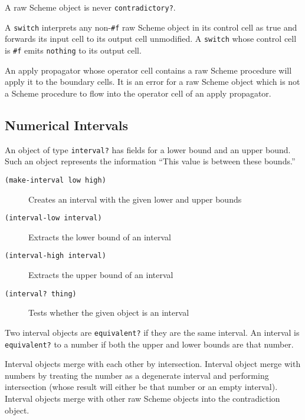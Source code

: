 \documentclass[12pt,letterpaper,english]{article}
\begin{document}
A raw Scheme object is never \texttt{contradictory?}.

A \texttt{switch} interprets any non-\texttt{{\#}f} raw Scheme object in its
control cell as true and forwards its input cell to its output cell
unmodified.  A \texttt{switch} whose control cell is \texttt{{\#}f} emits
\texttt{nothing} to its output cell.

An apply propagator whose operator cell contains a raw Scheme
procedure will apply it to the boundary cells.  It is an error for a
raw Scheme object which is not a Scheme procedure to flow into the
operator cell of an apply propagator.



\subsection{Numerical Intervals}
\label{numerical-intervals}

An object of type \texttt{interval?} has fields for a lower bound and an
upper bound.  Such an object represents the information ``This value is
between these bounds.''
\begin{description}
\item[{\texttt{(make-interval low high)}}] \leavevmode 
Creates an interval with the given lower and upper bounds

\item[{\texttt{(interval-low interval)}}] \leavevmode 
Extracts the lower bound of an interval

\item[{\texttt{(interval-high interval)}}] \leavevmode 
Extracts the upper bound of an interval

\item[{\texttt{(interval? thing)}}] \leavevmode 
Tests whether the given object is an interval

\end{description}

Two interval objects are \texttt{equivalent?} if they are the same
interval.  An interval is \texttt{equivalent?} to a number if both the
upper and lower bounds are that number.

Interval objects merge with each other by intersection.  Interval
object merge with numbers by treating the number as a degenerate
interval and performing intersection (whose result will either be that
number or an empty interval).  Interval objects merge with other
raw Scheme objects into the contradiction object.
\end{document}

